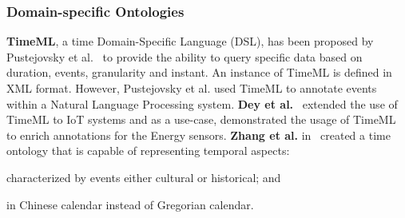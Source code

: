 \documentclass{elsart}  %
\begin{document}
\subsubsection{Domain-specific Ontologies}

\textbf{TimeML}, a time Domain-Specific Language (DSL), has been proposed by Pustejovsky et al.~\cite{Pustejovsky} to provide the ability to query specific data based on duration, events, granularity and instant. An instance of TimeML is defined in XML format. However, Pustejovsky et al. used TimeML to annotate events within a Natural Language Processing system. \textbf{Dey et al.}~\cite{dey} extended the use of TimeML to IoT systems and as a use-case, demonstrated the usage of TimeML to enrich annotations for the Energy sensors. \textbf{Zhang et al.} in~\cite{ZhangChinese} created a time ontology that is capable of representing temporal aspects: \begin{inparaenum} \item characterized by events either cultural or historical; and \item in Chinese calendar instead of Gregorian calendar.\end{inparaenum}
\end{document}
